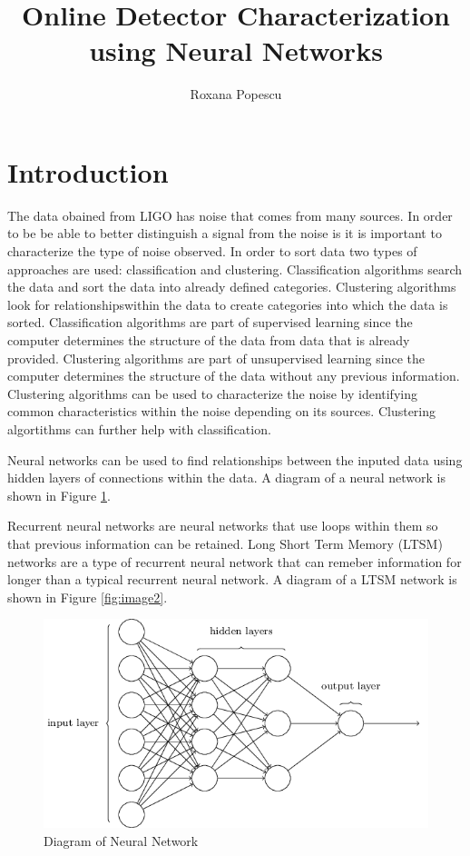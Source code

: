 \documentclass[colorlinks=true,pdfstartview=FitV,linkcolor=blue,
            citecolor=red,urlcolor=magenta]{ligodoc}
\title{Online Detector Characterization using Neural Networks}
\author{Roxana Popescu}
\begin{document}
\section{Introduction} 
\par The data obained from LIGO has noise that comes from many sources. In order to be be able to better distinguish a signal from the noise is it is important to characterize the type of noise observed. In order to sort data two types of approaches are used: classification and clustering. Classification algorithms search the data and sort the data into already defined categories. Clustering algorithms look for relationshipswithin the data to create categories into which the data is sorted. Classification algorithms are part of supervised learning since the computer determines the structure of the data from data that is already provided. Clustering algorithms are part of unsupervised learning since the computer determines the structure of the data without any previous information.  Clustering algorithms can be used to characterize the noise by identifying common characteristics within the noise depending on its sources. Clustering algortithms can further help with classification. 

\par Neural networks can be used to find relationships between the inputed data using hidden layers of connections within the data. A diagram of a neural network is shown in Figure \ref{fig:image1}.

\par  Recurrent neural networks are neural networks that use  loops within them so that previous information can be retained. Long Short Term Memory (LTSM) networks are a type of recurrent neural network that can remeber information for longer than a typical recurrent neural network. A diagram of a LTSM network is shown in Figure \ref{fig:image2}. 

\begin{figure}[htbp]
\begin{center}
\includegraphics[width=6in]{neuralnetwork.png}
\caption{Diagram of Neural Network}
\label{fig:image1}
\end{center}
\end{figure}    
\end{document}
